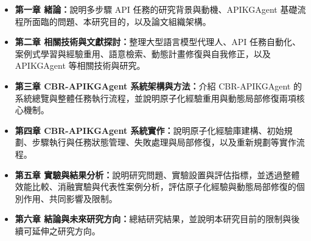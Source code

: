 \begin{itemize}
    \item \textbf{第一章 緒論：}說明多步驟 API 任務的研究背景與動機、APIKGAgent 基礎流程所面臨的問題、本研究目的，以及論文組織架構。
    \item \textbf{第二章 相關技術與文獻探討：}整理大型語言模型代理人、API 任務自動化、案例式學習與經驗重用、語意檢索、動態計畫修復與自我修正，以及 APIKGAgent 等相關技術與研究。
    \item \textbf{第三章 CBR-APIKGAgent 系統架構與方法：}介紹 CBR-APIKGAgent 的系統總覽與整體任務執行流程，並說明原子化經驗重用與動態局部修復兩項核心機制。
    \item \textbf{第四章 CBR-APIKGAgent 系統實作：}說明原子化經驗庫建構、初始規劃、步驟執行與任務狀態管理、失敗處理與局部修復，以及重新規劃等實作流程。
    \item \textbf{第五章 實驗與結果分析：}說明研究問題、實驗設置與評估指標，並透過整體效能比較、消融實驗與代表性案例分析，評估原子化經驗與動態局部修復的個別作用、共同影響及限制。
    \item \textbf{第六章 結論與未來研究方向：}總結研究結果，並說明本研究目前的限制與後續可延伸之研究方向。
\end{itemize}
